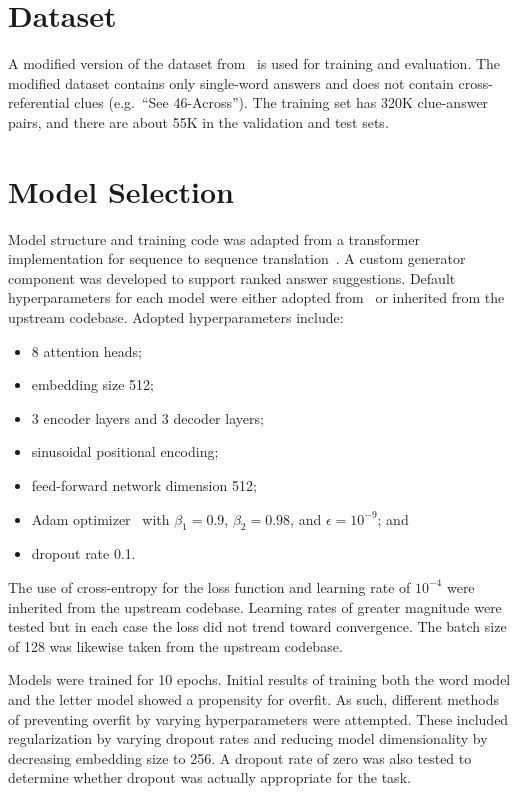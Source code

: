 \documentclass[letterpaper]{article} %
\begin{document}
\begin{NoHyper}
\section{Dataset}
\label{sec:dataset}

A modified version of the dataset from~\citealp{kulshreshtha2022across} is used for training and evaluation.
The modified dataset contains only single-word answers and does not contain cross-referential clues (e.g.~``See 46-Across'').
The training set has 320K clue-answer pairs, and there are about 55K in the validation and test sets.

\section{Model Selection}
\label{sec:model}

Model structure and training code was adapted from a transformer implementation for sequence to sequence translation~\cite{chegde2022}.
A custom generator component was developed to support ranked answer suggestions.
Default hyperparameters for each model were either adopted from~\citealp{vaswani2017} or inherited from the upstream codebase.
Adopted hyperparameters include:

\begin{itemize}
\item 8 attention heads;
\item embedding size 512;
\item 3 encoder layers and 3 decoder layers;
\item sinusoidal positional encoding;
\item feed-forward network dimension 512;
\item Adam optimizer~\cite{kingma2017adam} with $\beta_1 = 0.9$, $\beta_2 = 0.98$, and $\epsilon = 10^{-9}$; and
\item dropout rate 0.1.
\end{itemize}

The use of cross-entropy for the loss function and learning rate of $10^{-4}$ were inherited from the upstream codebase.
Learning rates of greater magnitude were tested but in each case the loss did not trend toward convergence.
The batch size of 128 was likewise taken from the upstream codebase.

Models were trained for 10 epochs.
Initial results of training both the word model and the letter model showed a propensity for overfit.
As such, different methods of preventing overfit by varying hyperparameters were attempted.
These included regularization by varying dropout rates and reducing model dimensionality by decreasing embedding size to 256.
A dropout rate of zero was also tested to determine whether dropout was actually appropriate for the task.


\end{NoHyper}
\end{document}
